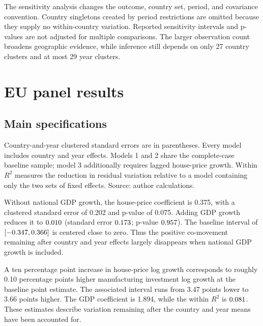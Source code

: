\documentclass[11pt,letterpaper]{article}
\begin{document}
The sensitivity analysis changes the outcome, country set, period, and covariance convention. Country singletons created by period restrictions are omitted because they supply no within-country variation. Reported sensitivity intervals and p-values are not adjusted for multiple comparisons. The larger observation count broadens geographic evidence, while inference still depends on only 27 country clusters and at most 29 year clusters.

\section{EU panel results}
\subsection{Main specifications}
\begin{table}[!htbp]\centering\begin{threeparttable}
\caption{EU manufacturing investment growth: country and year fixed effects}\label{tab:3}
\small{}\setlength{\tabcolsep}{4pt}\renewcommand{\arraystretch}{1.22}

\begin{tablenotes}[flushleft]\footnotesize{}
\item Country-and-year clustered standard errors are in parentheses. Every model includes country and year effects. Models 1 and 2 share the complete-case baseline sample; model 3 additionally requires lagged house-price growth. Within $R^2$ measures the reduction in residual variation relative to a model containing only the two sets of fixed effects. Source: author calculations.
\end{tablenotes}\end{threeparttable}\end{table}\FloatBarrier

Without national GDP growth, the house-price coefficient is 0.375, with a clustered standard error of 0.202 and p-value of 0.075. Adding GDP growth reduces it to $0.010$ (standard error $0.173$; p-value $0.957$). The baseline interval of $[-0.347,0.366]$ is centered close to zero. Thus the positive co-movement remaining after country and year effects largely disappears when national GDP growth is included.

A ten percentage point increase in house-price log growth corresponds to roughly 0.10 percentage points higher manufacturing investment log growth at the baseline point estimate. The associated interval runs from 3.47 points lower to 3.66 points higher. The GDP coefficient is 1.894, while the within $R^2$ is $0.081$. These estimates describe variation remaining after the country and year means have been accounted for.
\end{document}
